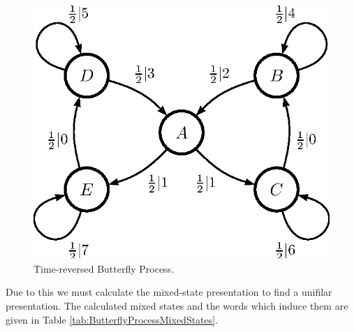 \documentclass[prl,twocolumn,showpacs,superscriptaddress,preprintnumbers,floatfix]{revtex4}
\theoremstyle{plain}   \newtheorem{Lem}{Lemma}
\theoremstyle{plain} 	\newtheorem{Cor}{Corollary}
\theoremstyle{plain} 	\newtheorem{The}{Theorem}
\theoremstyle{plain} 	\newtheorem{Prop}{Proposition}
\theoremstyle{plain} 	\newtheorem*{Conj}{Conjecture}
\theoremstyle{plain}	\newtheorem*{Rem}{Remark}
\theoremstyle{plain}	\newtheorem*{Def}{Definition}
\theoremstyle{plain}	\newtheorem*{Not}{Notation}
\begin{document}
\begin{figure}[th]
\centering
\includegraphics{butterfly_TRfeM_ur.eps}
\caption{Time-reversed Butterfly Process.}
\label{fig:TRButterflyProcess}
\end{figure}

Due to this we must calculate the mixed-state presentation to find a unifilar
presentation. The calculated mixed states and the words which induce them are
given in Table \ref{tab:ButterflyProcessMixedStates}.
\end{document}
